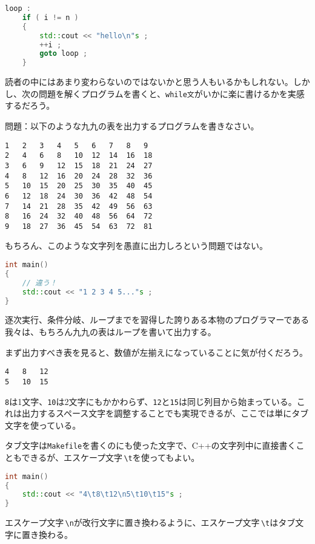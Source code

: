 \begin{lstlisting}[language={C++}]
loop :
    if ( i != n )
    {
        std::cout << "hello\n"s ;
        ++i ;
        goto loop ;
    }
\end{lstlisting}

読者の中にはあまり変わらないのではないかと思う人もいるかもしれない。しかし、次の問題を解くプログラムを書くと、\texttt{while文}がいかに楽に書けるかを実感するだろう。

\ifTombow\pagebreak\fi
\textsf{問題}：以下のような九九の表を出力するプログラムを書きなさい。

\begin{lstlisting}[style=terminal]
1   2   3   4   5   6   7   8   9   
2   4   6   8   10  12  14  16  18  
3   6   9   12  15  18  21  24  27  
4   8   12  16  20  24  28  32  36  
5   10  15  20  25  30  35  40  45  
6   12  18  24  30  36  42  48  54  
7   14  21  28  35  42  49  56  63  
8   16  24  32  40  48  56  64  72  
9   18  27  36  45  54  63  72  81
\end{lstlisting}

もちろん、このような文字列を愚直に出力しろという問題ではない。

\begin{lstlisting}[language={C++}]
int main()
{
    // 違う！
    std::cout << "1 2 3 4 5..."s ;
}
\end{lstlisting}

逐次実行、条件分岐、ループまでを習得した誇りある本物のプログラマーである我々は、もちろん九九の表はループを書いて出力する。

まず出力すべき表を見ると、数値が左揃えになっていることに気が付くだろう。

\begin{lstlisting}[style=terminal]
4   8   12
5   10  15
\end{lstlisting}

\texttt{8}は1文字、\texttt{10}は2文字にもかかわらず、\texttt{12}と\texttt{15}は同じ列目から始まっている。これは出力するスペース文字を調整することでも実現できるが、ここでは単にタブ文字を使っている。

タブ文字は\texttt{Makefile}を書くのにも使った文字で、C++の文字列中に直接書くこともできるが、エスケープ文字\,\texttt{{\textbackslash}t}を使ってもよい。

\begin{lstlisting}[language={C++}]
int main()
{
    std::cout << "4\t8\t12\n5\t10\t15"s ;
}
\end{lstlisting}

エスケープ文字\,\texttt{{\textbackslash}n}が改行文字に置き換わるように、エスケープ文字\,\texttt{{\textbackslash}t}はタブ文字に置き換わる。

